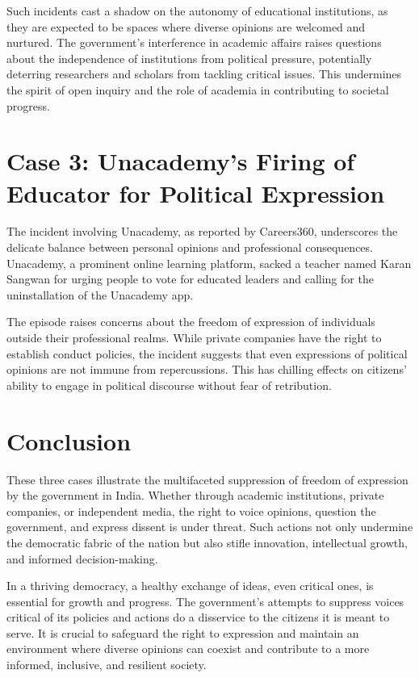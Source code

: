 \documentclass{article}
\begin{document}
	Such incidents cast a shadow on the autonomy of educational institutions, as they are expected to be spaces where diverse opinions are welcomed and nurtured. The government's interference in academic affairs raises questions about the independence of institutions from political pressure, potentially deterring researchers and scholars from tackling critical issues. This undermines the spirit of open inquiry and the role of academia in contributing to societal progress.
	
	\section{Case 3: Unacademy's Firing of Educator for Political Expression}
	The incident involving Unacademy, as reported by Careers360, underscores the delicate balance between personal opinions and professional consequences. Unacademy, a prominent online learning platform, sacked a teacher named Karan Sangwan for urging people to vote for educated leaders and calling for the uninstallation of the Unacademy app.
	
	The episode raises concerns about the freedom of expression of individuals outside their professional realms. While private companies have the right to establish conduct policies, the incident suggests that even expressions of political opinions are not immune from repercussions. This has chilling effects on citizens' ability to engage in political discourse without fear of retribution.
	
	\section{Conclusion}
	These three cases illustrate the multifaceted suppression of freedom of expression by the government in India. Whether through academic institutions, private companies, or independent media, the right to voice opinions, question the government, and express dissent is under threat. Such actions not only undermine the democratic fabric of the nation but also stifle innovation, intellectual growth, and informed decision-making.
	
	In a thriving democracy, a healthy exchange of ideas, even critical ones, is essential for growth and progress. The government's attempts to suppress voices critical of its policies and actions do a disservice to the citizens it is meant to serve. It is crucial to safeguard the right to expression and maintain an environment where diverse opinions can coexist and contribute to a more informed, inclusive, and resilient society.
	
\end{document}
